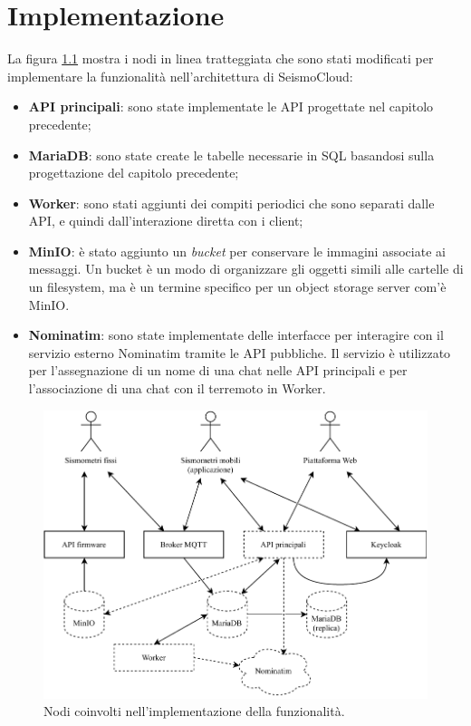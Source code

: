 \chapter{Implementazione}
\label{ch:impl}

La figura \ref{fig:architettura-modify} mostra i nodi in linea tratteggiata che sono stati modificati per implementare la funzionalità nell'architettura di SeismoCloud:

\begin{itemize}
\item \textbf{API principali}: sono state implementate le API progettate nel capitolo precedente;
\item \textbf{MariaDB}: sono state create le tabelle necessarie in SQL basandosi sulla progettazione del capitolo precedente;
\item \textbf{Worker}: sono stati aggiunti dei compiti periodici che sono separati dalle API, e quindi dall'interazione diretta con i client;
\item \textbf{MinIO}: è stato aggiunto un \textit{bucket} per conservare le immagini associate ai messaggi. Un bucket è un modo di organizzare gli oggetti simili alle cartelle di un filesystem, ma è un termine specifico per un object storage server com'è MinIO.
\item \textbf{Nominatim}: sono state implementate delle interfacce per interagire con il servizio esterno Nominatim tramite le API pubbliche. Il servizio è utilizzato per l'assegnazione di un nome di una chat nelle API principali e per l'associazione di una chat con il terremoto in Worker.
\end{itemize}

\begin{figure}[ht!]
\centering
\includegraphics[width=\textwidth]{assets/04/architettura-modify.pdf}
\caption{Nodi coinvolti nell'implementazione della funzionalità.}
\label{fig:architettura-modify}
\end{figure}


